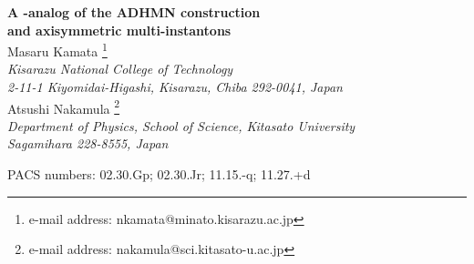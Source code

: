\documentclass[a4paper,10pt]{article}
\providecommand{\sutwo}{\myHighlight{$SU(2)$}\coordHE{} }
\begin{document}
\thispagestyle{empty}
\begin{center}
{\Large \bf A \coordHE{}-analog of the ADHMN construction}\\ 
\vspace{5 mm}
{\Large \bf and axisymmetric multi-instantons}\\
\vspace{2cm}
Masaru Kamata 
\footnote[1]
{e-mail address: nkamata@minato.kisarazu.ac.jp} \\
  \vspace{0.7cm}
  {\it Kisarazu National College of Technology\\
    2-11-1 Kiyomidai-Higashi, Kisarazu, Chiba 292-0041, Japan}\\
  \vspace{1cm}
Atsushi Nakamula
\footnote[2]
{e-mail address: nakamula@sci.kitasato-u.ac.jp}\\
  \vspace{0.7cm}
{\it Department of Physics, School of Science, Kitasato University\\
Sagamihara 228-8555, Japan}\\
  \vspace{1.5cm}
\end{center}  
%
%
%
%
%

\begin{abstract}
In the preceding paper (1999 \textit{Phys.Lett.~}\textbf{B463} 257), the authors presented a \coordHE{}-analog of the ADHMN construction and obtained a family of anti-selfdual configurations with a parameter \coordHE{} for classical \sutwo Yang-Mills theory in four-dimensional Euclidean space.
The family of solutions can be seen as a \coordHE{}-analog of the single BPS monopole preserving (anti-)selfduality.
Further discussion is made on the relation to axisymmetric ansatz on anti-selfdual equation given by Witten in the late seventies. 
It is found  that the \coordHE{}-exponential functions familiar in \coordHE{}-analysis appear as analytic functions categorizing the anti-selfdual configurations yielded by axisymmetric ansatz.
\end{abstract}

PACS numbers: 02.30.Gp; 02.30.Jr; 11.15.-q; 11.27.+d
\newpage
\setcounter{page}{2}
\setcounter{section}{0}
\end{document}
